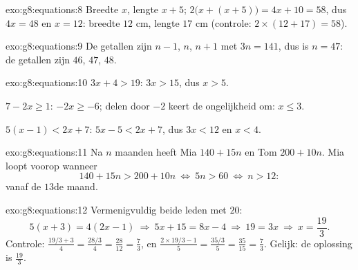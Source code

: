 \begin{solution}{exo:g8:equations:8}
Breedte $x$, lengte $x + 5$; 
$2\bigl(x + (x + 5)\bigr) = 4x + 10 = 58$, dus $4x = 48$ en $x = 12$: breedte
$12$ cm, lengte $17$ cm (controle: $2 \times (12 + 17) = 58$).
\end{solution}

\begin{solution}{exo:g8:equations:9}
De getallen zijn $n - 1$, $n$, $n + 1$ met  $3n = 141$, dus is $n = 47$: de
getallen zijn $46$, $47$, $48$.
\end{solution}

\begin{solution}{exo:g8:equations:10}
$3x + 4 > 19$: $3x > 15$, dus $x > 5$.

$7 - 2x \geq 1$: $-2x \geq -6$; delen door $-2$ keert de ongelijkheid om:
$x \leq 3$.

$5(x-1) < 2x + 7$: $5x - 5 < 2x + 7$, dus $3x < 12$ en $x < 4$.
\end{solution}

\begin{solution}{exo:g8:equations:11}
Na $n$ maanden heeft Mia $140 + 15n$ en Tom $200 + 10n$. Mia loopt voorop
wanneer
\[
140 + 15n > 200 + 10n
\ \Longleftrightarrow\
5n > 60
\ \Longleftrightarrow\
n > 12 :
\]
vanaf de $13$de maand.
\end{solution}

\begin{solution}{exo:g8:equations:12}
Vermenigvuldig beide leden met $20$:
\[
5(x + 3) = 4(2x - 1)
\ \Longrightarrow\
5x + 15 = 8x - 4
\ \Longrightarrow\
19 = 3x
\ \Longrightarrow\
x = \frac{19}{3}.
\]
Controle: $\frac{19/3 + 3}{4} = \frac{28/3}{4} = \frac{28}{12} =
\frac73$, en $\frac{2 \times 19/3 - 1}{5} = \frac{35/3}{5} =
\frac{35}{15} = \frac73$. Gelijk: de oplossing is $\frac{19}{3}$.
\end{solution}

